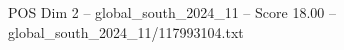 \begin{textsample}{POS Dim 2 – global\_south\_2024\_11 – Score 18.00 – global\_south\_2024\_11/117993104.txt}
\end{textsample}
